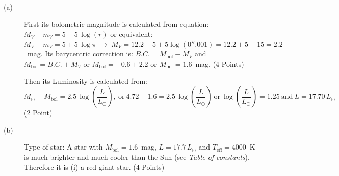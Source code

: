 \begin{description}
\item[(a)] First its bolometric magnitude is calculated from equation:
  $M_V - m_V = 5 - 5\,\log(r)$ or equivalent:
  $M_V - m_V = 5 + 5\,\log\pi \;\rightarrow\;
  M_V = 12.2 + 5 + 5\log(0''.001) = 12.2 + 5 - 15 = 2.2$~mag.
  Its barycentric correction is: %
  $B.C. = M_{\mathrm{bol}} - M_V$ and $M_{\mathrm{bol}} = B.C. + M_V$ or
  $M_{\mathrm{bol}} = -0.6 + 2.2$ or $M_{\mathrm{bol}} = 1.6$~mag.
  \hfill(4 Points)

  Then its Luminosity is calculated from:
  \[
    M_\odot - M_{\mathrm{bol}} = 2.5\,\log\!\left(\frac{L}{L_\odot}\right),
    \ \text{or}\
    4.72 - 1.6 = 2.5\,\log\!\left(\frac{L}{L_\odot}\right)
    \ \text{or}\
    \log\!\left(\frac{L}{L_\odot}\right) = 1.25
    \ \text{and}\ L = 17.70\,L_\odot
  \]
  \hfill(2 Point)
\item[(b)] Type of star: A star with $M_{\mathrm{bol}} = 1.6$~mag,
  $L = 17.7\,L_\odot$ and $T_{\mathrm{eff}} = 4000$~K is much brighter and much
  cooler than the Sun (see \emph{Table of constants}). Therefore it is (i) a red
  giant star.
  \hfill(4 Points)
\end{description}

